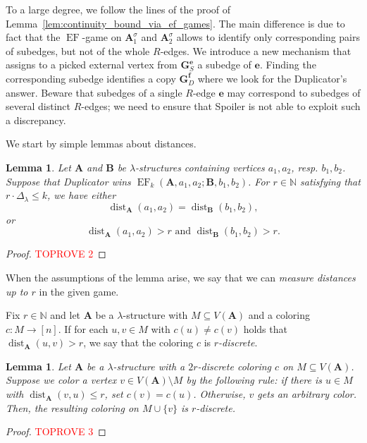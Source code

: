 \documentclass[11pt]{article}
\theoremstyle{plain}
\newtheorem{lemma}[theorem]{Lemma}
\theoremstyle{definition}
\theoremstyle{remark}
\DeclareMathOperator\dist{dist}
\newcommand{\N}{\mathbb{N}}
\DeclareMathOperator{\EF}{EF}
\newcommand{\str}[1]{\mathbf{#1}}
\newcommand{\maxarity}[1]{\Delta_{#1}}
\newcommand{\tpl}[1]{{\bm{#1}}}
\begin{document}
To a large degree, we follow the lines of the proof of Lemma~\ref{lem:continuity_bound_via_ef_games}.
The main difference is due to fact that the $\EF$-game on $\str{A}_1^\sigma$ and $\str{A}_2^\sigma$ allows to identify only corresponding pairs of subedges, but not of the whole $R$-edges.
We introduce a new mechanism that assigns to a picked external vertex from $\str{G}_S^\tpl{e}$ a subedge of $\tpl{e}$.
Finding the corresponding subedge identifies a copy $\str{G}_D^\tpl{f}$ where we look for the Duplicator's answer.
Beware that subedges of a single $R$-edge $\tpl{e}$ may correspond to subedges of several distinct $R$-edges; we need to ensure that Spoiler is not able to exploit such a discrepancy.

We start by simple lemmas about distances.

\begin{lemma}\label{lem:measuring_distances}
    Let $\str{A}$ and $\str{B}$ be $\lambda$-structures containing vertices $a_1, a_2$, resp. $b_1, b_2$.
    Suppose that Duplicator wins $\EF_k(\str{A}, a_1, a_2; \str{B}, b_1, b_2)$.
    For $r \in \N$ satisfying that $r \cdot \maxarity{\lambda} \leq k$, we have either
    \[
        \dist_\str{A}(a_1, a_2) = \dist_\str{B}(b_1, b_2)
        ,
    \]
    or
    \[
        \dist_\str{A}(a_1, a_2) > r \text{ and } \dist_\str{B}(b_1, b_2) > r
        .
    \]
\end{lemma}
\begin{proof}\textcolor{red}{TOPROVE 2}\end{proof}

When the assumptions of the lemma arise, we say that we can \emph{measure distances up to $r$} in the given game.

Fix $r \in \N$ and let $\str{A}$ be a $\lambda$-structure with $M \subseteq V(\str{A})$ and a coloring $c: M \to [n]$.
If for each $u,v \in M$ with $c(u) \not= c(v)$ holds that $\dist_\str{A}(u,v) > r$, we say that the coloring $c$ is \emph{$r$-discrete}.

\begin{lemma}\label{lem:about_discrete_colorings}
    Let $\str{A}$ be a $\lambda$-structure with a $2r$-discrete coloring $c$ on $M \subseteq V(\str{A})$.
    Suppose we color a vertex $v \in V(\str{A}) \setminus M$ by the following rule:
    if there is $u \in M$ with $\dist_\str{A}(v,u) \leq r$, set $c(v) = c(u)$.
    Otherwise, $v$ gets an arbitrary color.
    Then, the resulting coloring on $M \cup \{v\}$ is $r$-discrete.
\end{lemma}
\begin{proof}\textcolor{red}{TOPROVE 3}\end{proof}
\end{document}
